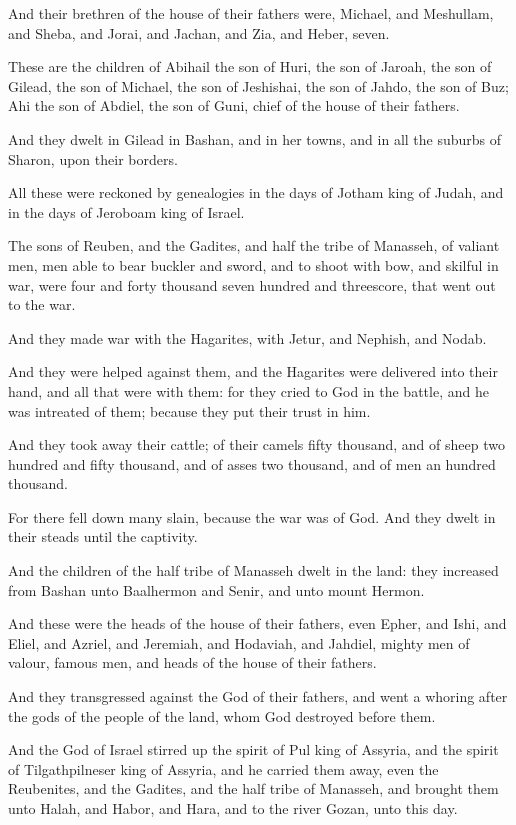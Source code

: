 \verse And their brethren of the house of their fathers were, Michael, and Meshullam, and Sheba, and Jorai, and Jachan, and Zia, and Heber, seven.

\verse These are the children of Abihail the son of Huri, the son of Jaroah, the son of Gilead, the son of Michael, the son of Jeshishai, the son of Jahdo, the son of Buz; \verse Ahi the son of Abdiel, the son of Guni, chief of the house of their fathers.

\verse And they dwelt in Gilead in Bashan, and in her towns, and in all the suburbs of Sharon, upon their borders.

\verse All these were reckoned by genealogies in the days of Jotham king of Judah, and in the days of Jeroboam king of Israel.

\verse The sons of Reuben, and the Gadites, and half the tribe of Manasseh, of valiant men, men able to bear buckler and sword, and to shoot with bow, and skilful in war, were four and forty thousand seven hundred and threescore, that went out to the war.

\verse And they made war with the Hagarites, with Jetur, and Nephish, and Nodab.

\verse And they were helped against them, and the Hagarites were delivered into their hand, and all that were with them: for they cried to God in the battle, and he was intreated of them; because they put their trust in him.

\verse And they took away their cattle; of their camels fifty thousand, and of sheep two hundred and fifty thousand, and of asses two thousand, and of men an hundred thousand.

\verse For there fell down many slain, because the war was of God. And they dwelt in their steads until the captivity.

\verse And the children of the half tribe of Manasseh dwelt in the land: they increased from Bashan unto Baalhermon and Senir, and unto mount Hermon.

\verse And these were the heads of the house of their fathers, even Epher, and Ishi, and Eliel, and Azriel, and Jeremiah, and Hodaviah, and Jahdiel, mighty men of valour, famous men, and heads of the house of their fathers.

\verse And they transgressed against the God of their fathers, and went a whoring after the gods of the people of the land, whom God destroyed before them.

\verse And the God of Israel stirred up the spirit of Pul king of Assyria, and the spirit of Tilgathpilneser king of Assyria, and he carried them away, even the Reubenites, and the Gadites, and the half tribe of Manasseh, and brought them unto Halah, and Habor, and Hara, and to the river Gozan, unto this day.


